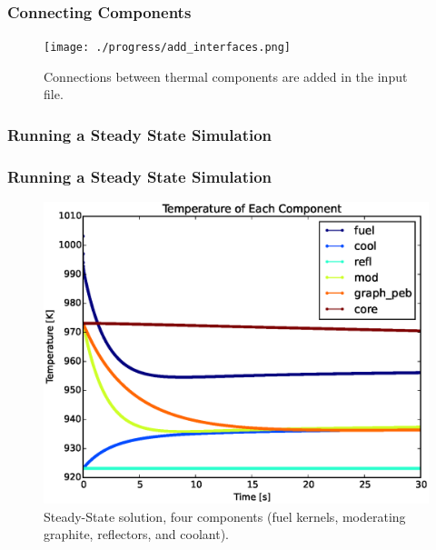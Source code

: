 \begin{frame}[fragile]
\frametitle{Connecting Components}
  \begin{figure}[htbp!]
    \begin{center}
      \texttt{[image: ./progress/add\_interfaces.png]}
    \end{center}
    \caption{Connections between thermal components are added in the input
    file.}
    \label{fig:ss_w_o_feedbacks}
  \end{figure}
\end{frame}



\begin{frame}[fragile]
\frametitle{Running a Steady State Simulation}

\end{frame}

\begin{frame}[fragile]
\frametitle{Running a Steady State Simulation}
  \begin{figure}[htbp!]
    \begin{center}
      \includegraphics[height=0.7\textheight]{./progress/temps_all_comps_ss.eps}
    \end{center}
    \caption{Steady-State solution, four components (fuel kernels, moderating
    graphite, reflectors, and coolant).}
    \label{fig:ss_w_o_feedbacks}
  \end{figure}
\end{frame}

